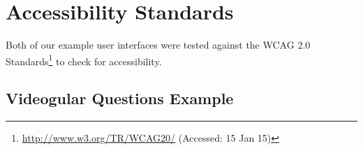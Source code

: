\chapter{Accessibility Standards} 
\label{Chapter:Accessibility Standards}
Both of our example user interfaces were tested against the \gls{WCAG} 2.0 Standards\footnote{\url{http://www.w3.org/TR/WCAG20/} (Accessed: 15 Jan 15)} to check for accessibility.

\section{Videogular Questions Example}
\label{Section: Conformance of Videogular Questions Example}
